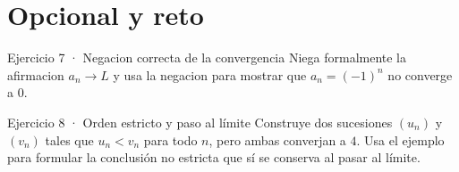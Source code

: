 \documentclass[10pt,a4paper,oneside,openany]{book}
\begin{document}
\section*{Opcional y reto}
\begin{PSevenOptionalFixed}{Ejercicio 7 · Negacion correcta de la convergencia}
Niega formalmente la afirmacion \(a_n\to L\) y usa la negacion para mostrar que \(a_n=(-1)^n\) no converge a \(0\).
\end{PSevenOptionalFixed}
\begin{PSevenOptionalFixed}{Ejercicio 8 · Orden estricto y paso al límite}
Construye dos sucesiones \((u_n)\) y \((v_n)\) tales que \(u_n<v_n\) para todo \(n\), pero ambas converjan a \(4\). Usa el ejemplo para formular la conclusión no estricta que sí se conserva al pasar al límite.
\end{PSevenOptionalFixed}
\end{document}
